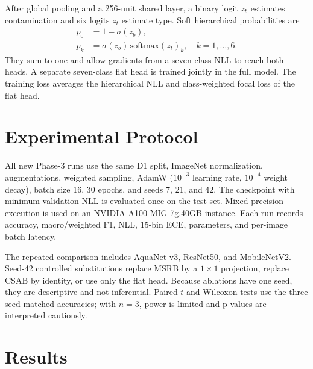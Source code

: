 \documentclass[journal]{IEEEtran}
\begin{document}
After global pooling and a 256-unit shared layer, a binary logit $z_b$ estimates contamination and six logits $z_t$ estimate type. Soft hierarchical probabilities are
\begin{align}
p_0 &= 1-\sigma(z_b),\\
p_k &= \sigma(z_b)\,\mathrm{softmax}(z_t)_k,\quad k=1,\ldots,6.
\end{align}
They sum to one and allow gradients from a seven-class NLL to reach both heads. A separate seven-class flat head is trained jointly in the full model. The training loss averages the hierarchical NLL and class-weighted focal loss of the flat head.

\section{Experimental Protocol}
All new Phase-3 runs use the same D1 split, ImageNet normalization, augmentations, weighted sampling, AdamW ($10^{-3}$ learning rate, $10^{-4}$ weight decay), batch size 16, 30 epochs, and seeds 7, 21, and 42. The checkpoint with minimum validation NLL is evaluated once on the test set. Mixed-precision execution is used on an NVIDIA A100 MIG 7g.40GB instance. Each run records accuracy, macro/weighted F1, NLL, 15-bin ECE, parameters, and per-image batch latency.

The repeated comparison includes AquaNet v3, ResNet50, and MobileNetV2. Seed-42 controlled substitutions replace MSRB by a $1\times1$ projection, replace CSAB by identity, or use only the flat head. Because ablations have one seed, they are descriptive and not inferential. Paired $t$ and Wilcoxon tests use the three seed-matched accuracies; with $n=3$, power is limited and p-values are interpreted cautiously.

\section{Results}
\end{document}
